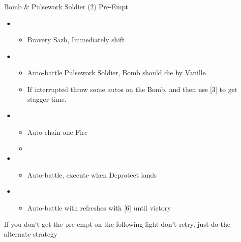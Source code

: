 \begin{multicols}{2}
\begin{battle}{Bomb \& Pulsework Soldier (2) Pre-Empt}
\begin{itemize}
    \item \second
    \begin{itemize}
        \item Bravery Sazh, Immediately shift
    \end{itemize}
    \item \first
    \begin{itemize}
        \item Auto-battle Pulsework Soldier, Bomb should die by Vanille.
        \item If interrupted throw some autos on the Bomb, and then use [3] to get stagger time.
    \end{itemize}
    \item \fifth
    \begin{itemize}
        \item Auto-chain one Fire
        \item \stagger
    \end{itemize}
    \item \third
    \begin{itemize}
        \item Auto-battle, execute when Deprotect lands
    \end{itemize}
    \item \first
    \begin{itemize}
        \item Auto-battle with refreshes with [6] until victory
    \end{itemize}
\end{itemize}
\end{battle}
If you don't get the pre-empt on the following fight don't retry, just do the alternate strategy

\end{multicols}
\newpage
